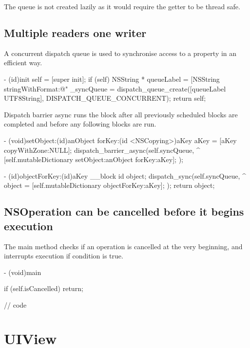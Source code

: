 \documentclass[10pt]{extarticle}
\newenvironment{codelisting}
{\footnotesize\mdframed[middlelinewidth=0.5pt, middlelinecolor=BaliHaiColor, skipabove=15pt]\verbatim}
{\endverbatim\endmdframed\vspace{12pt}\normalsize}
\newenvironment{importantlisting}
{\mdframed[middlelinewidth=0.5pt, middlelinecolor=MatisseColor, skipabove=15pt]{\textbf{Important:}}}
{\endmdframed\vspace{12pt}}
\begin{document}
\begin{importantlisting}
The queue is not created lazily as it would require the getter to be thread safe.
\end{importantlisting}


\subsection{Multiple readers one writer}

A concurrent dispatch queue is used to synchronise access to a property in an efficient way.

\begin{codelisting}
- (id)init
{
    self = [super init];
    if (self) {
        NSString * queueLabel = [NSString stringWithFormat:@"%
        _syncQueue = dispatch_queue_create([queueLabel UTF8String], DISPATCH_QUEUE_CONCURRENT);
    }
    return self;
}
\end{codelisting}

Dispatch barrier async runs the block after all previously scheduled blocks are completed and before any following blocks are run.

\begin{codelisting}
- (void)setObject:(id)anObject forKey:(id <NSCopying>)aKey
{
    aKey = [aKey copyWithZone:NULL];
    dispatch_barrier_async(self.syncQueue, ^{
        [self.mutableDictionary setObject:anObject forKey:aKey];
    });
}

- (id)objectForKey:(id)aKey
{
    __block id object;
    dispatch_sync(self.syncQueue, ^{
        object = [self.mutableDictionary objectForKey:aKey];
    });
    return object;
}
\end{codelisting}


\subsection{NSOperation can be cancelled before it begins execution}

The main method checks if an operation is cancelled at the very beginning, and interrupts execution if condition is true.

\begin{codelisting}
- (void)main
{
    if (self.isCancelled) return;
    
    // code
}
\end{codelisting}


\section{UIView}
\end{document}
